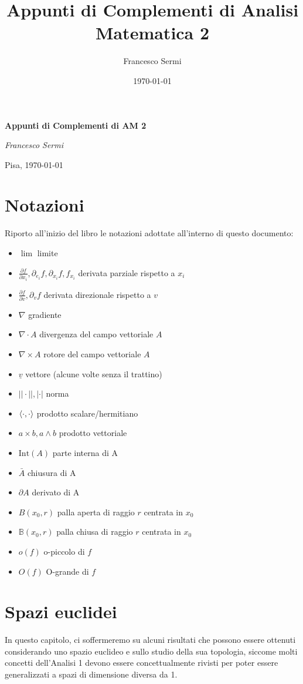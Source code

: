 \documentclass[openany]{book}
\title{Appunti di Complementi di Analisi Matematica 2}
\author{Francesco Sermi}
\date{\today}
\begin{document}
	\begin{titlepage}
	\centering
	\vspace*{3cm}
	{\huge\bfseries Appunti di Complementi di AM 2 \par}
	\vspace{2cm}
	{\Large\itshape Francesco Sermi\par}
	\vfill
	{\large \hfill Pisa, \today \par}
	\end{titlepage}
	\tableofcontents
	\chapter*{Notazioni}
	Riporto all'inizio del libro le notazioni adottate all'interno di questo documento:
	\begin{itemize}[label=\hspace{-0.5em}]
		\item $\lim$ limite		
		\item $\frac{\partial f}{\partial x_i}, \partial_{e_i} f, \partial_{x_i} f, f_{x_i}$ derivata parziale rispetto a $x_i$
		\item $\frac{\partial f}{\partial v}, \partial_v f$ derivata direzionale rispetto a $v$
		\item $\nabla$ gradiente
		\item $\nabla \cdot A$ divergenza del campo vettoriale $A$
		\item $\nabla \times A$ rotore del campo vettoriale $A$
		\item $\underline{v}$ vettore (alcune volte senza il trattino)
		\item $||\cdot||, |\cdot|$ norma
		\item $\langle \cdot, \cdot \rangle$ prodotto scalare/hermitiano
		\item $a \times b, a \wedge b$ prodotto vettoriale
		\item $\text{Int}(A)$ parte interna di A
		\item $\bar{A}$ chiusura di A
		\item $\partial A$ derivato di A
		\item $B(x_0, r)$ palla aperta di raggio $r$ centrata in $x_0$
		\item $\mathbb{B}(x_0, r)$ palla chiusa di raggio $r$ centrata in $x_0$
		\item $o(f)$ o-piccolo di $f$
		\item $O(f)$ O-grande di $f$
	\end{itemize}
	\chapter{Spazi euclidei}
	In questo capitolo, ci soffermeremo su alcuni risultati che possono essere ottenuti considerando uno spazio euclideo e sullo studio della sua topologia, siccome molti concetti dell'Analisi 1 devono essere concettualmente rivisti per poter essere generalizzati a spazi di dimensione diversa da 1.
\end{document}
